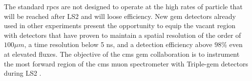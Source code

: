 The standard {rpc}s are not designed to operate at the high rates of particle that will be reached after LS2 and will loose efficiency. New {gem} detectors already used in other experiments present the opportunity to equip the vacant region with detectors that have proven to maintain a spatial resolution of the order of $100\mu m$, a time resolution below 5 ns, and a detection efficiency above $98\%$  even at elevated fluxes. The objective of the {cms} {gem} collaboration is to instrument the most forward region of the {cms} muon spectrometer with Triple-{gem} detectors during LS2 \cite{phdThesis:Lenzi}.

